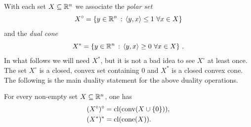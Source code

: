 With each set $X \subseteq \mathbb{R}^n$ we associate the \emph{polar set}
\[
	X^\circ = \left\{ y \in \mathbb{R}^n \,:\, \left\langle y , x \right\rangle \le 1 \ \forall x \in X \right\}
\]
and the \emph{dual cone}
\[
	X^\ast = \left\{ y \in \mathbb{R}^n \,:\, \left\langle y , x \right\rangle \ge 0 \ \forall x \in X \right\} \,.
\]
In what follows we will need $X^\ast$, but it is not a bad idea to see $X^\circ$ at least once. The set $X^\circ$ is a closed, convex set containing $0$ and $X^\ast$ is a closed convex cone. The following is the main duality statement for the above duality operations. 
\begin{proposition}
	For every non-empty set $X \subseteq \mathbb{R}^n$, one has
	\begin{align*}
		(X^\circ)^\circ & = \operatorname{cl}(\operatorname{conv}(X \cup \{0\})),
		\\ (X^\ast)^\ast & = \operatorname{cl}(\operatorname{cone}(X)).
	\end{align*}
\end{proposition}
